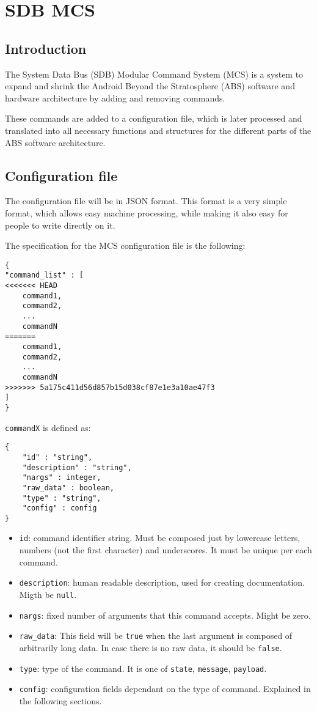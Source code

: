 \documentclass[12pt,a4paper]{report}
\begin{document}
\section*{SDB MCS}

\subsection*{Introduction}
The System Data Bus (SDB) Modular Command System (MCS) is a system to expand and shrink the Android Beyond the Stratosphere (ABS) software and hardware architecture by adding and removing commands.

These commands are added to a configuration file, which is later processed and translated into all necessary functions and structures for the different parts of the ABS software architecture.

\subsection*{Configuration file}
The configuration file will be in JSON format. This format is a very simple format, which allows easy machine processing, while making it also easy for people to write directly on it.

The specification for the MCS configuration file is the following:

\begin{lstlisting}
{
"command_list" : [
<<<<<<< HEAD
    command1,
    command2,
    ...
    commandN
=======
	command1,
	command2,
	...
	commandN
>>>>>>> 5a175c411d56d857b15d038cf87e1e3a10ae47f3
]
}
\end{lstlisting}

\texttt{commandX} is defined as:
\begin{lstlisting}
{
    "id" : "string",
    "description" : "string",
    "nargs" : integer,
    "raw_data" : boolean,
    "type" : "string",
    "config" : config
}
\end{lstlisting}

\begin{itemize}
\item \texttt{id}: command identifier string. Must be composed just by lowercase letters, numbers (not the first character) and underscores. It must be unique per each command.
\item \texttt{description}: human readable description, used for creating documentation. Migth be \texttt{null}.
\item \texttt{nargs}: fixed number of arguments that this command accepts. Might be zero.
\item \texttt{raw\_data}: This field will be \texttt{true} when the last argument is composed of arbitrarily long data. In case there is no raw data, it should be \texttt{false}.
\item \texttt{type}: type of the command. It is one of \texttt{state}, \texttt{message}, \texttt{payload}.
\item \texttt{config}: configuration fields dependant on the type of command. Explained in the following sections.
\end{itemize}
\end{document}
